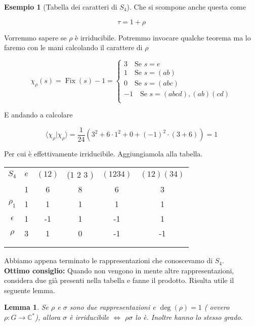 \documentclass[11pt]{article}
\theoremstyle{plain}
\newtheorem{lemma}[thm]{Lemma}
\theoremstyle{definition}
\newtheorem{exmp}{Esempio}[section]
\theoremstyle{remark}
\DeclareMathOperator{\Fix}{Fix}
\begin{document}
\begin{exmp}[Tabella dei caratteri di $S_4$]
Che si scompone anche questa come

\[ \tau = 1 + \rho\]

Vorremmo sapere se $\rho$ è irriducibile. Potremmo invocare qualche teorema ma lo faremo con le mani calcolando il carattere di $\rho$


\[ \chi_\rho(s) = \Fix(s) - 1 =
\begin{cases}
3 \quad \text{Se } s = e \\
1 \quad \text{Se } s = (a b) \\
0 \quad \text{Se } s = (a b c) \\
-1 \quad \text{Se } s = (a b c d ), (a b) (c d)\\
\end{cases}
\]

E andando a calcolare

\[\langle\chi_\rho |\chi_\rho\rangle = \dfrac{1}{24}\left(3^2  + 6 \cdot 1^2  + 0 + (-1)^2 \cdot (3 +6 )\right) = 1\]


Per cui è effettivamente irriducibile.  Aggiungiamola alla tabella.


\begin{table}[!ht]
\centering
\begin{tabular}{|c|c|c|c|c|c|}
\hline
$S_4$  & $e$ & $(1 2)$ & (1 2 3 ) & $(1 2 3 4)$ & $(1 2)(3 4)$ \\
 & 1 & 6 & 8 & 6 & 3 \\
\hline
 $\rho_1$ & 1 & 1  & 1 & 1 & 1\\
\hline
$\epsilon$ & 1  & -1 & 1 & -1 & 1 \\
\hline
$\rho$& 3 & 1 & 0 & -1 & -1\\
\hline
& &  & & & \\
\hline
& &  & & & \\
\hline
\end{tabular}
\end{table}

Abbiamo appena terminato le rappresentazioni che conoscevamo di $S_4$.\\
\textbf{Ottimo consiglio:} Quando non vengono in mente altre rappresentazioni, considera due già presenti nella tabella e fanne il prodotto. Risulta utile il seguente lemma.

\begin{lemma}
Se $\rho$ e $\sigma$ sono due rappresentazioni e $\deg(\rho)=1$ ( ovvero $\rho:G\rightarrow \mathbb{C}^*$), allora $\sigma$ è irriducibile $\Leftrightarrow$ $\rho\sigma$ lo è. Inoltre hanno lo stesso grado.
\end{lemma}


\end{exmp}
\end{document}
